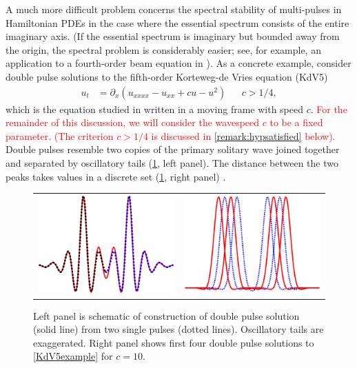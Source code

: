 \documentclass[12pt]{elsarticle}
\theoremstyle{plain}
\theoremstyle{definition}
\theoremstyle{remark}
\numberwithin{theorem}{section}
\numberwithin{equation}{section}
\newcommand{\revised}[1]{ \textcolor{red}{#1} }
\begin{document}
A much more difficult problem concerns the spectral stability of multi-pulses in Hamiltonian PDEs in the case where the essential spectrum consists of the entire imaginary axis. (If the essential spectrum is imaginary but bounded away from the origin, the spectral problem is considerably easier; see, for example, an application to a fourth-order beam equation in \cite[Secton 6]{Kapitula2020}). As a concrete example, consider double pulse solutions to the fifth-order Korteweg-de Vries equation (KdV5)
\begin{align}\label{KdV5example}
u_t &= \partial_x\left( u_{xxxx} - u_{xx} + c u - u^2\right) && c > 1/4,
\end{align}
which is the equation studied in \cite{Pelinovsky2007} written in a moving frame with speed $c$. 
\revised{For the remainder of this discussion, we will consider the wavespeed $c$ to be a fixed parameter. (The criterion $c>1/4$ is discussed in \cref{remark:hypsatisfied} below).
}
Double pulses resemble two copies of the primary solitary wave joined together and separated by oscillatory tails (\cref{fig:KdV5double}, left panel). The distance between the two peaks takes values in a discrete set (\cref{fig:KdV5double}, right panel) \cite{Pelinovsky2007,SandstedeStrut}. 
\begin{figure}
\begin{center}
\begin{tabular}{cc}
\includegraphics[width=7cm]{images/dpconstruction.eps} &
\includegraphics[width=7cm]{images/doublepulsealt.eps}
\end{tabular}
\end{center}
\caption{Left panel is schematic of construction of double pulse solution (solid line) from two single pulses (dotted lines). Oscillatory tails are exaggerated. Right panel shows first four double pulse solutions to \cref{KdV5example} for $c = 10$.}
\label{fig:KdV5double}
\end{figure} 
\end{document}

